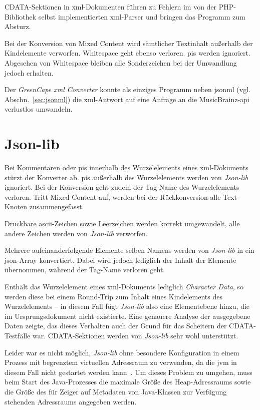 CDATA-Sektionen in \acrshort{xml}-Dokumenten führen zu Fehlern im von der PHP-Bibliothek selbst implementierten \acrshort{xml}-Parser und bringen das Programm zum Absturz.

Bei der Konversion von Mixed Content wird sämtlicher Textinhalt außerhalb der Kindelemente verworfen. Whitespace geht ebenso verloren. \glspl{pi} werden ignoriert. Abgesehen von Whitespace bleiben alle Sonderzeichen bei der Umwandlung jedoch erhalten.

Der \emph{GreenCape \acrshort{xml} Converter} konnte als einziges Programm neben \acrshort{jsonml} (vgl. Abschn.~\ref{sec:jsonml}) die \acrshort{xml}-Antwort auf eine Anfrage an die MusicBrainz-\acrshort{api} verlustlos umwandeln.

\section{Json-lib}
\label{sec:jsonlib}

Bei Kommentaren oder \glspl{pi} innerhalb des Wurzelelements eines \acrshort{xml}-Dokuments stürzt der Konverter ab. \glspl{pi} außerhalb des Wurzelelements werden von \emph{Json-lib} ignoriert. Bei der Konversion geht zudem der Tag-Name des Wurzelelements verloren. Tritt Mixed Content auf, werden bei der Rückkonversion alle Text-Knoten zusammengefasst.

Druckbare \acrshort{ascii}-Zeichen sowie Leerzeichen werden korrekt umgewandelt, alle andere Zeichen werden von \emph{Json-lib} verworfen.

Mehrere aufeinanderfolgende Elemente selben Namens werden von \emph{Json-lib} in ein \acrshort{json}-Array konvertiert. Dabei wird jedoch lediglich der Inhalt der Elemente übernommen, während der Tag-Name verloren geht.

Enthält das Wurzelelement eines \acrshort{xml}-Dokuments lediglich \emph{Character Data}, so werden diese bei einem Round-Trip zum Inhalt eines Kindelements des Wurzelelements -- in diesem Fall fügt \emph{Json-lib} also eine Elementebene hinzu, die im Ursprungsdokument nicht existierte. Eine genauere Analyse der ausgegebene Daten zeigte, das dieses Verhalten auch der Grund für das Scheitern der CDATA-Testfälle war. CDATA-Sektionen werden von \emph{Json-lib} sehr wohl unterstützt.

Leider war es nicht möglich, \emph{Json-lib} ohne besondere Konfiguration in einem Prozess mit begrenztem virtuellen Adressraum zu verwenden, da die \acrfull{jvm} in diesem Fall nicht gestartet werden kann~\cite{jvmmemlimit}. Um dieses Problem zu umgehen, muss beim Start des Java-Prozesses die maximale Größe des Heap-Adressraums sowie die Größe des für Zeiger auf Metadaten von Java-Klassen zur Verfügung stehenden Adressraums angegeben werden.

